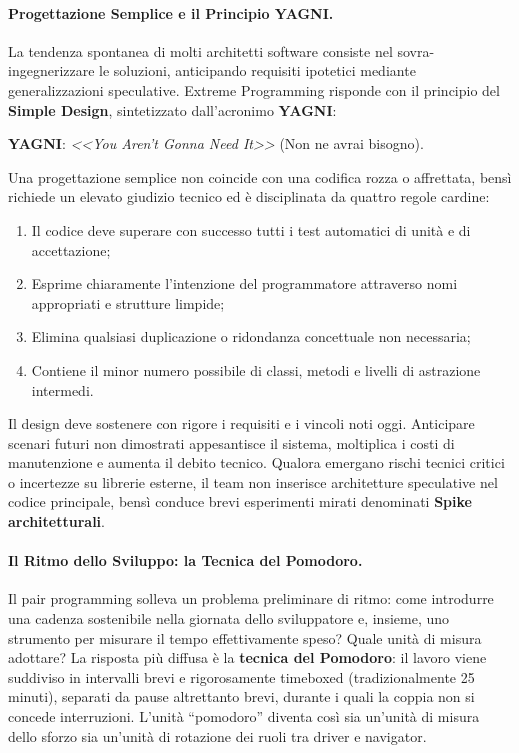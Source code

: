 \documentclass[12pt]{extarticle}
\begin{document}
\paragraph{Progettazione Semplice e il Principio YAGNI.}
La tendenza spontanea di molti architetti software consiste nel sovra-ingegnerizzare le soluzioni, anticipando requisiti ipotetici mediante generalizzazioni speculative. Extreme Programming risponde con il principio del \textbf{Simple Design}, sintetizzato dall'acronimo \textbf{YAGNI}:
\begin{center}
    \textbf{YAGNI}: \textit{<<You Aren't Gonna Need It>>} (Non ne avrai bisogno).
\end{center}
\noindent Una progettazione semplice non coincide con una codifica rozza o affrettata, bensì richiede un elevato giudizio tecnico ed è disciplinata da quattro regole cardine:
\begin{enumerate}
    \item Il codice deve superare con successo tutti i test automatici di unità e di accettazione;
    \item Esprime chiaramente l'intenzione del programmatore attraverso nomi appropriati e strutture limpide;
    \item Elimina qualsiasi duplicazione o ridondanza concettuale non necessaria;
    \item Contiene il minor numero possibile di classi, metodi e livelli di astrazione intermedi.
\end{enumerate}
\noindent Il design deve sostenere con rigore i requisiti e i vincoli noti oggi. Anticipare scenari futuri non dimostrati appesantisce il sistema, moltiplica i costi di manutenzione e aumenta il debito tecnico. Qualora emergano rischi tecnici critici o incertezze su librerie esterne, il team non inserisce architetture speculative nel codice principale, bensì conduce brevi esperimenti mirati denominati \textbf{Spike architetturali}.

\paragraph{Il Ritmo dello Sviluppo: la Tecnica del Pomodoro.}
Il pair programming solleva un problema preliminare di ritmo: come introdurre una cadenza sostenibile nella giornata dello sviluppatore e, insieme, uno strumento per misurare il tempo effettivamente speso? Quale unità di misura adottare? La risposta più diffusa è la \textbf{tecnica del Pomodoro}: il lavoro viene suddiviso in intervalli brevi e rigorosamente timeboxed (tradizionalmente 25 minuti), separati da pause altrettanto brevi, durante i quali la coppia non si concede interruzioni. L'unità ``pomodoro'' diventa così sia un'unità di misura dello sforzo sia un'unità di rotazione dei ruoli tra driver e navigator.
\end{document}
